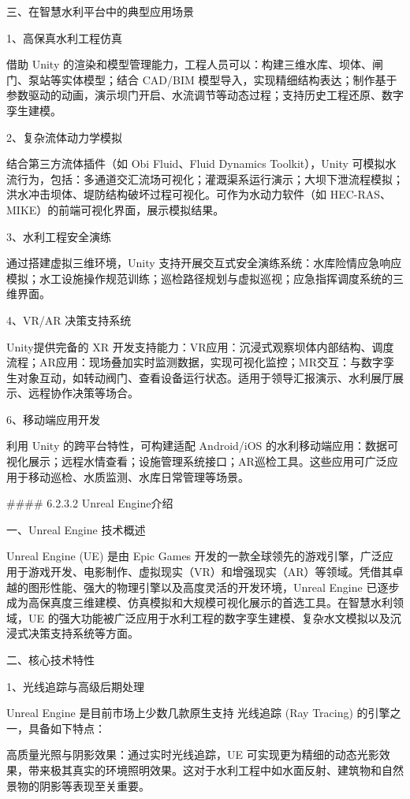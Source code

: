 三、在智慧水利平台中的典型应用场景

1、高保真水利工程仿真

借助 Unity 的渲染和模型管理能力，工程人员可以：构建三维水库、坝体、闸门、泵站等实体模型；结合 CAD/BIM 模型导入，实现精细结构表达；制作基于参数驱动的动画，演示坝门开启、水流调节等动态过程；支持历史工程还原、数字孪生建模。

2、复杂流体动力学模拟

结合第三方流体插件（如 Obi Fluid、Fluid Dynamics Toolkit），Unity 可模拟水流行为，包括：多通道交汇流场可视化；灌溉渠系运行演示；大坝下泄流程模拟；洪水冲击坝体、堤防结构破坏过程可视化。可作为水动力软件（如 HEC-RAS、MIKE）的前端可视化界面，展示模拟结果。

3、水利工程安全演练

通过搭建虚拟三维环境，Unity 支持开展交互式安全演练系统：水库险情应急响应模拟；水工设施操作规范训练；巡检路径规划与虚拟巡视；应急指挥调度系统的三维界面。

4、VR/AR 决策支持系统

Unity提供完备的 XR 开发支持能力：VR应用：沉浸式观察坝体内部结构、调度流程；AR应用：现场叠加实时监测数据，实现可视化监控；MR交互：与数字孪生对象互动，如转动阀门、查看设备运行状态。适用于领导汇报演示、水利展厅展示、远程协作决策等场合。

6、移动端应用开发

利用 Unity 的跨平台特性，可构建适配 Android/iOS 的水利移动端应用：数据可视化展示；远程水情查看；设施管理系统接口；AR巡检工具。这些应用可广泛应用于移动巡检、水质监测、水库日常管理等场景。

\#\#\#\# 6.2.3.2 Unreal Engine介绍

一、Unreal Engine 技术概述

Unreal Engine (UE) 是由 Epic Games 开发的一款全球领先的游戏引擎，广泛应用于游戏开发、电影制作、虚拟现实（VR）和增强现实（AR）等领域。凭借其卓越的图形性能、强大的物理引擎以及高度灵活的开发环境，Unreal Engine 已逐步成为高保真度三维建模、仿真模拟和大规模可视化展示的首选工具。在智慧水利领域，UE 的强大功能被广泛应用于水利工程的数字孪生建模、复杂水文模拟以及沉浸式决策支持系统等方面。

二、核心技术特性

1、光线追踪与高级后期处理

Unreal Engine 是目前市场上少数几款原生支持 光线追踪 (Ray Tracing) 的引擎之一，具备如下特点：

高质量光照与阴影效果：通过实时光线追踪，UE 可实现更为精细的动态光影效果，带来极其真实的环境照明效果。这对于水利工程中如水面反射、建筑物和自然景物的阴影等表现至关重要。

